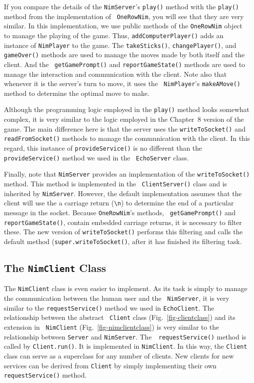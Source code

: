 {If you compare the details of the {\tt NimServer}'s {\tt play()}
method with the {\tt play()} method from the implementation of {\tt
OneRowNim}, you will see that they are very similar.  In this
implementation, we use public methods of the {\tt OneRowNim} object to
manage the playing of the game. Thus, {\tt addComputerPlayer()} adds
an instance of {\tt NimPlayer} to the game. The {\tt takeSticks()},
{\tt changePlayer()}, and {\tt gameOver()} methods are used to manage
the moves made by both itself and the client.  And the {\tt
getGamePrompt()} and {\tt reportGameState()} methods are used to
manage the interaction and communication with the client.  Note also
that whenever it is the server's turn to move, it uses the {\tt
NimPlayer}'s {\tt makeAMove()} method to determine the optimal move to
make.

Although the programming logic employed in the {\tt play()}
method looks somewhat complex, it is very similar to the logic
employed in the Chapter~8 version of the game. The main difference
here is that the server uses the {\tt writeToSocket()} and {\tt
readFromSocket()} methods to manage the communication with the client.
In this regard, this instance of {\tt provideService()} is no
different than the {\tt provideService()} method we used in the {\tt
EchoServer} class.

Finally, note that {\tt NimServer} provides an implementation of the
{\tt writeToSocket()} method. This method is implemented in the {\tt
ClientServer()} class and is inherited by {\tt NimServer}.  However,
the default implementation assumes that the client will use the a
carriage return ({\tt \verb|\n|}) to determine the end of a particular
message in the socket.  Because {\tt OneRowNim}'s methods, {\tt
getGamePrompt()} and {\tt reportGameState()}, contain embedded
carriage returns, it is necessary to filter these. 
The new version of {\tt writeToSocket()} performs this filtering and calls the
default method ({\tt super.writeToSocket()}, after it has finished its
filtering task.

\subsection{The {\tt NimClient} Class}

The {\tt NimClient} class is even easier to implement. As its task is
simply to manage the communication between the human user and the {\tt
NimServer}, it is very similar to the {\tt requestService()} method we
used in {\tt EchoClient}.  The relationship between the abstract {\tt
Client} class (Fig.~\ref{fig-clientclass}) and its extension in {\tt
NimClient} (Fig.~\ref{fig-nimclientclass}) is very similar to the
relationship between {\tt Server} and {\tt NimServer}.  The~{\tt
request\-Service()} method is called by {\tt Client.run()}.  It is
implemented in {\tt NimClient}. In this way, the {\tt Client} class
can serve as a superclass for any number of clients.
New clients for new services can be derived from {\tt Client} by
simply implementing their own {\tt requestService()} method.  


}
